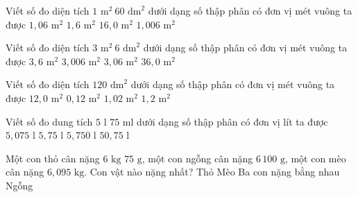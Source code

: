 \begin{ex} %
Viết số đo diện tích $1\text{ m}^2\ 60\text{ dm}^2$ dưới dạng số thập phân có đơn vị mét vuông ta được
\choice
{$1{,}06\text{ m}^2$}
{\True $1{,}6\text{ m}^2$}
{$16{,}0\text{ m}^2$}
{$1{,}006\text{ m}^2$}
\end{ex}

\begin{ex} %
Viết số đo diện tích $3\text{ m}^2\ 6\text{ dm}^2$ dưới dạng số thập phân có đơn vị mét vuông ta được
\choice
{$3{,}6\text{ m}^2$}
{$3{,}006\text{ m}^2$}
{\True $3{,}06\text{ m}^2$}
{$36{,}0\text{ m}^2$}
\end{ex}

\begin{ex} %
Viết số đo diện tích $120\text{ dm}^2$ dưới dạng số thập phân có đơn vị mét vuông ta được
\choice
{$12{,}0\text{ m}^2$}
{$0{,}12\text{ m}^2$}
{$1{,}02\text{ m}^2$}
{\True $1{,}2\text{ m}^2$}
\end{ex}

\begin{ex} %
Viết số đo dung tích $5\text{ l } 75\text{ ml}$ dưới dạng số thập phân có đơn vị lít ta được
\choice
{\True $5{,}075\text{ l}$}
{$5{,}75\text{ l}$}
{$5{,}750\text{ l}$}
{$50{,}75\text{ l}$}
\end{ex}

\begin{ex} %
Một con thỏ cân nặng $6\text{ kg } 75\text{ g}$, một con ngỗng cân nặng $6\,100\text{ g}$, một con mèo cân nặng $6{,}095\text{ kg}$. Con vật nào nặng nhất?
\choice
{Thỏ}
{Mèo}
{Ba con nặng bằng nhau}
{\True Ngỗng}
\end{ex}

